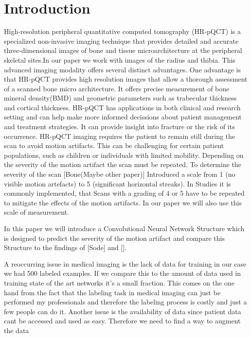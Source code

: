 \documentclass[acmsmall, review]{acmart}
\begin{document}
\section{Introduction}
	
	High-resolution peripheral quantitative computed tomography (HR-pQCT) is a specialized non-invasive imaging technique that provides detailed and accurate three-dimensional images of bone and tissue microarchitecture at the peripheral skeletal sites.In our paper we work with images of the radius and thibia. This advanced imaging modality offers several distinct advantages. One advantage is that HR-pQCT provides high resolution images that allow a thorough assessment of a scanned bone micro architecture. It offers precise measurement of bone mineral density(BMD) and geometric parameters such as trabecular thickness and cortical thickness. HR-pQCT has applications in both clinical and research setting and can help make more informed decissions about patient management and treatment strategies. It can provide insight into fracture or the risk of its occurrence. HR-pQCT imaging requires the patient to remain still during the scan to avoid motion artifacts. This can be challenging for certain patient populations, such as children or individuals with limited  mobility. Depending on the severity of the motion artifact the scan must be repeated. To determine the severity of the scan [Bone(Maybe other paper)] Introduced a scale from 1 (no visible motion artefacts) to 5 (significant horizontal streaks). In Studies it is commonly implemented, that Scans with a grading of 4 or 5 have to be repeated to mitigate the effects of the motion artifacts. In our paper we will also use this scale of measurement.
	
	In this paper we will introduce a Convolutional Neural Network Structure which is designed to predict the severity of the motion artifact and compare this Structure to the findings of [Sode] and []. 
	
	A reoccurring issue in medical imaging is the lack of data for training in our case we had 500 labeled examples. If we compare this to the amount of data used in training state of the art networks it's a small fraction. This comes on the one hand from the fact that the labeling task in medical imaging can just be performed my professionals and therefore the labeling process is costly and just a few people can do it. Another issue is the availability of data since patient data cant be accessed and used as easy. Therefore we need to find a way to augment the data 
\end{document}
